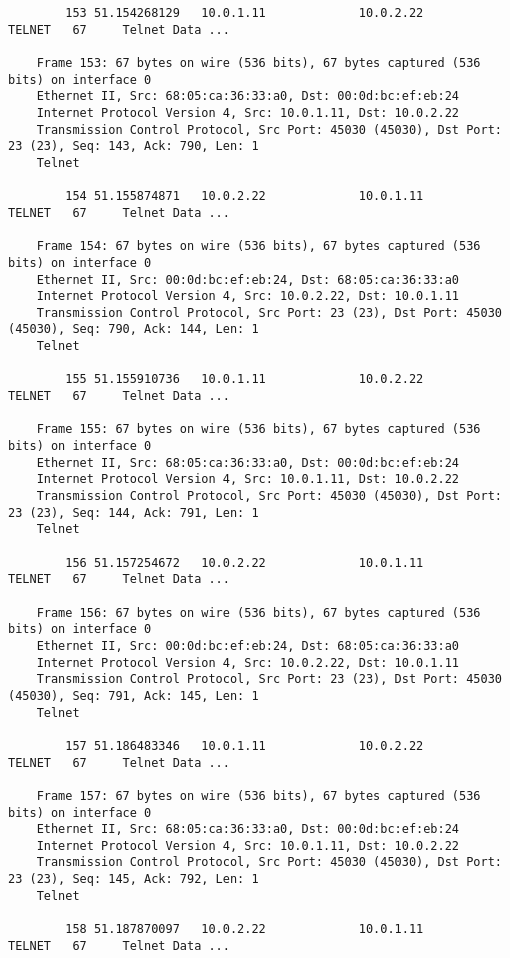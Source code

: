 \begin{verbatim}
		153 51.154268129   10.0.1.11             10.0.2.22             TELNET   67     Telnet Data ...

	Frame 153: 67 bytes on wire (536 bits), 67 bytes captured (536 bits) on interface 0
	Ethernet II, Src: 68:05:ca:36:33:a0, Dst: 00:0d:bc:ef:eb:24
	Internet Protocol Version 4, Src: 10.0.1.11, Dst: 10.0.2.22
	Transmission Control Protocol, Src Port: 45030 (45030), Dst Port: 23 (23), Seq: 143, Ack: 790, Len: 1
	Telnet

		154 51.155874871   10.0.2.22             10.0.1.11             TELNET   67     Telnet Data ...

	Frame 154: 67 bytes on wire (536 bits), 67 bytes captured (536 bits) on interface 0
	Ethernet II, Src: 00:0d:bc:ef:eb:24, Dst: 68:05:ca:36:33:a0
	Internet Protocol Version 4, Src: 10.0.2.22, Dst: 10.0.1.11
	Transmission Control Protocol, Src Port: 23 (23), Dst Port: 45030 (45030), Seq: 790, Ack: 144, Len: 1
	Telnet

		155 51.155910736   10.0.1.11             10.0.2.22             TELNET   67     Telnet Data ...

	Frame 155: 67 bytes on wire (536 bits), 67 bytes captured (536 bits) on interface 0
	Ethernet II, Src: 68:05:ca:36:33:a0, Dst: 00:0d:bc:ef:eb:24
	Internet Protocol Version 4, Src: 10.0.1.11, Dst: 10.0.2.22
	Transmission Control Protocol, Src Port: 45030 (45030), Dst Port: 23 (23), Seq: 144, Ack: 791, Len: 1
	Telnet

		156 51.157254672   10.0.2.22             10.0.1.11             TELNET   67     Telnet Data ...

	Frame 156: 67 bytes on wire (536 bits), 67 bytes captured (536 bits) on interface 0
	Ethernet II, Src: 00:0d:bc:ef:eb:24, Dst: 68:05:ca:36:33:a0
	Internet Protocol Version 4, Src: 10.0.2.22, Dst: 10.0.1.11
	Transmission Control Protocol, Src Port: 23 (23), Dst Port: 45030 (45030), Seq: 791, Ack: 145, Len: 1
	Telnet

		157 51.186483346   10.0.1.11             10.0.2.22             TELNET   67     Telnet Data ...

	Frame 157: 67 bytes on wire (536 bits), 67 bytes captured (536 bits) on interface 0
	Ethernet II, Src: 68:05:ca:36:33:a0, Dst: 00:0d:bc:ef:eb:24
	Internet Protocol Version 4, Src: 10.0.1.11, Dst: 10.0.2.22
	Transmission Control Protocol, Src Port: 45030 (45030), Dst Port: 23 (23), Seq: 145, Ack: 792, Len: 1
	Telnet

		158 51.187870097   10.0.2.22             10.0.1.11             TELNET   67     Telnet Data ...


\end{verbatim}
